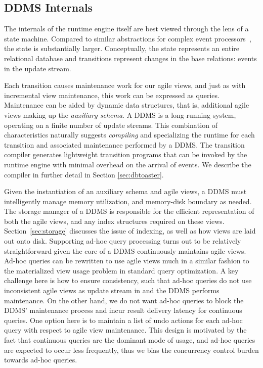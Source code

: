 \subsection{DDMS Internals}


The internals of the runtime engine itself are best viewed through the lens of a
state machine.  Compared to similar abstractions for complex event
processors~\cite{agrawal-sigmod:08, demers-sigmod:07}, the state is
substantially larger. Conceptually, the state represents an entire
relational database and transitions represent changes in the base
relations: events in the update stream.



Each transition causes maintenance work for our agile views, and just as
with incremental view maintenance, this work can be expressed as queries.
Maintenance can be aided by dynamic data structures, that is, additional agile
views making up the \textit{auxiliary schema}.
A DDMS is a long-running system, operating on a finite number of update streams.
This combination of characteristics naturally suggests \textit{compiling} and
specializing the runtime for each transition and associated maintenance
performed by a DDMS. The transition compiler generates lightweight transition
programs that can be invoked by the runtime engine with minimal overhead on the
arrival of events. We describe the compiler in further detail in Section
\ref{sec:dbtoaster}.




Given the instantiation of an auxiliary schema and agile views, a DDMS must
intelligently manage memory utilization, and memory-disk boundary as needed. The
storage manager of a DDMS is responsible for the efficient representation of
both the agile views, and any index structures required on these views.
Section~\ref{sec:storage} discusses the issue of indexing, as well as how views
are laid out onto disk. Supporting ad-hoc query processing turns out to be
relatively straightforward given the core of a DDMS continuously maintains agile
views. Ad-hoc queries can be rewritten to use agile views much in a similar
fashion to the materialized view usage problem in standard query optimization. A
key challenge here is how to ensure consistency, such that ad-hoc queries do not
use inconsistent agile views as update stream in and the DDMS performs
maintenance. On the other hand, we do not want ad-hoc queries to block the DDMS'
maintenance process and incur result delivery latency for continuous queries.
One option here is to maintain a list of undo actions for each ad-hoc query with
respect to agile view maintenance. This design is motivated by the fact that
continuous queries are the dominant mode of usage, and ad-hoc queries are
expected to occur less frequently, thus we bias the concurrency control burden
towards ad-hoc queries.





